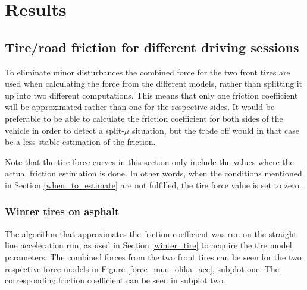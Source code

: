 \chapter{Results}
\label{chapter_five}

\section{Tire/road friction for different driving sessions}



To eliminate minor disturbances the combined force for the two front tires are used when calculating the force from the different models, rather than splitting it up into two different computations. This means that only one friction coefficient will be approximated rather than one for the respective sides. It would be preferable to be able to calculate the friction coefficient for both sides of the vehicle in order to detect a split-$ \mu $ situation, but the trade off would in that case be a less stable estimation of the friction.

Note that the tire force curves in this section only include the values where the actual friction estimation is done. In other words, when the conditions mentioned in Section \ref{when_to_estimate} are not fulfilled, the tire force value is set to zero. 

\subsection{Winter tires on asphalt}
The algorithm that approximates the friction coefficient was run on the straight line acceleration run, as used in Section \ref{winter_tire} to acquire the tire model parameters. The combined forces from the two front tires can be seen for the two respective force models in Figure \ref{force_mue_olika_acc}, subplot one. The corresponding friction coefficient can be seen in subplot two. 

